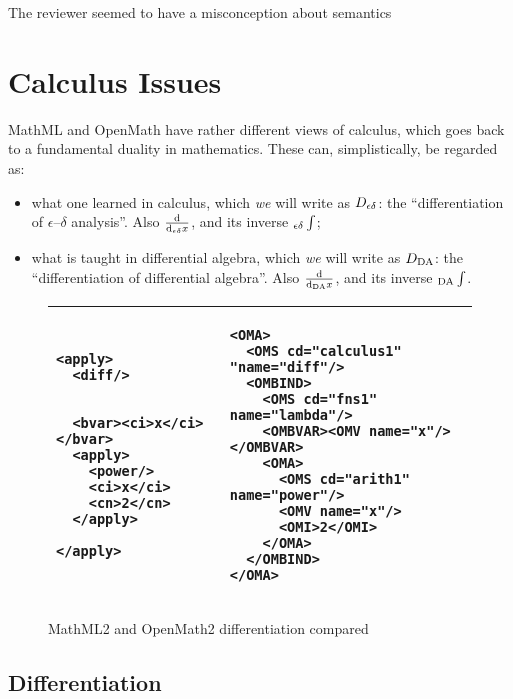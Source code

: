 \documentclass{llncs}
\begin{document}
\begin{newpart}{The reviewer seemed to have a misconception about semantics}
\section{Calculus Issues}
MathML and OpenMath have rather different views of calculus, which goes back to a
fundamental duality in mathematics. These can, simplistically, be regarded as:
\begin{itemize}
\item what one learned in calculus, which {\emph{we}} will write as $D_{\epsilon\delta}$: the
  ``differentiation of $\epsilon$--$\delta$ analysis''. Also $\frac{{\rm d}}{{\rm d}_{\epsilon\delta}x}$, and its
  inverse ${}_{\epsilon\delta}\int$;
\item what is taught in differential algebra, which {\emph{we}} will write as $D_{\rm DA}$: the
  ``differentiation of differential algebra''. Also $\frac{{\rm d}}{{\rm d}_{\rm DA}x}$, and its inverse
  ${}_{\rm DA}\int$.
\end{itemize}

\begin{figure}\lstset{frame=none,numbers=none}\centering
\lstset{aboveskip=-.7em,belowskip=-1.2em}
\begin{tabular}{|p{4.5cm}|p{7cm}|}\hline
\begin{lstlisting}[language=MathML2]
<apply>
  <diff/>
         
         
  <bvar><ci>x</ci></bvar>
  <apply>                
    <power/>             
    <ci>x</ci>           
    <cn>2</cn>           
  </apply>               
                         
</apply>                 
\end{lstlisting}&
\begin{lstlisting}
<OMA>
  <OMS cd="calculus1" "name="diff"/>
  <OMBIND>
    <OMS cd="fns1" name="lambda"/>
    <OMBVAR><OMV name="x"/></OMBVAR>
    <OMA>
      <OMS cd="arith1" name="power"/>
      <OMV name="x"/>
      <OMI>2</OMI>
    </OMA>
  </OMBIND>
</OMA>
\end{lstlisting}\\\hline
\end{tabular}
\caption{MathML2 and OpenMath2 differentiation compared}\label{lst:deriv}
\end{figure}

\iffull\subsection{Differentiation}\fi


\end{newpart}
\end{document}
